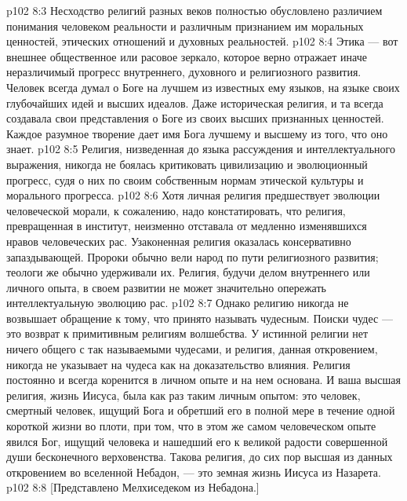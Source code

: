 \vs p102 8:3 Несходство религий разных веков полностью обусловлено различием понимания человеком реальности и различным признанием им моральных ценностей, этических отношений и духовных реальностей.
\vs p102 8:4 \pc Этика --- вот внешнее общественное или расовое зеркало, которое верно отражает иначе неразличимый прогресс внутреннего, духовного и религиозного развития. Человек всегда думал о Боге на лучшем из известных ему языков, на языке своих глубочайших идей и высших идеалов. Даже историческая религия, и та всегда создавала свои представления о Боге из своих высших признанных ценностей. Каждое разумное творение дает имя Бога лучшему и высшему из того, что оно знает.
\vs p102 8:5 Религия, низведенная до языка рассуждения и интеллектуального выражения, никогда не боялась критиковать цивилизацию и эволюционный прогресс, судя о них по своим собственным нормам этической культуры и морального прогресса.
\vs p102 8:6 Хотя личная религия предшествует эволюции человеческой морали, к сожалению, надо констатировать, что религия, превращенная в институт, неизменно отставала от медленно изменявшихся нравов человеческих рас. Узаконенная религия оказалась консервативно запаздывающей. Пророки обычно вели народ по пути религиозного развития; теологи же обычно удерживали их. Религия, будучи делом внутреннего или личного опыта, в своем развитии не может значительно опережать интеллектуальную эволюцию рас.
\vs p102 8:7 Однако религию никогда не возвышает обращение к тому, что принято называть чудесным. Поиски чудес --- это возврат к примитивным религиям волшебства. У истинной религии нет ничего общего с так называемыми чудесами, и религия, данная откровением, никогда не указывает на чудеса как на доказательство влияния. Религия постоянно и всегда коренится в личном опыте и на нем основана. И ваша высшая религия, жизнь Иисуса, была как раз таким личным опытом: это человек, смертный человек, ищущий Бога и обретший его в полной мере в течение одной короткой жизни во плоти, при том, что в этом же самом человеческом опыте явился Бог, ищущий человека и нашедший его к великой радости совершенной души бесконечного верховенства. Такова религия, до сих пор высшая из данных откровением во вселенной Небадон, --- это земная жизнь Иисуса из Назарета.
\vsetoff
\vs p102 8:8 [Представлено Мелхиседеком из Небадона.]
